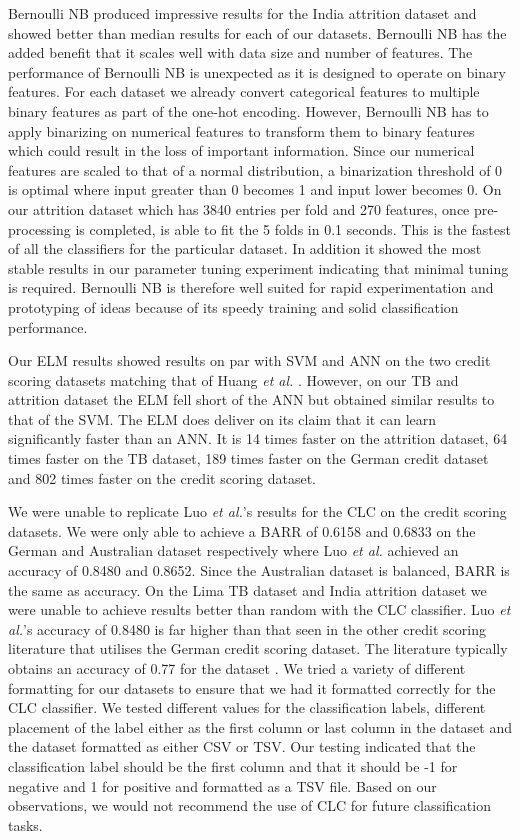 \documentclass{sig-alternate-05-2015}
\begin{document}
	Bernoulli NB produced impressive results for the India attrition dataset and showed better than median results for each of our datasets. Bernoulli NB has the added benefit that it scales well with data size and number of features. The performance of Bernoulli NB is unexpected as it is designed to operate on binary features. For each dataset we already convert categorical features to multiple binary features as part of the one-hot encoding. However, Bernoulli NB has to apply binarizing on numerical features to transform them to binary features which could result in the loss of important information. Since our numerical features are scaled to that of a normal distribution, a binarization threshold of 0 is optimal where input greater than 0 becomes 1 and input lower becomes 0. On our attrition dataset which has 3840 entries per fold and 270 features, once pre-processing is completed, is able to fit the 5 folds in 0.1 seconds. This is the fastest of all the classifiers for the particular dataset. In addition it showed the most stable results in our parameter tuning experiment indicating that minimal tuning is required. Bernoulli NB is therefore well suited for rapid experimentation and prototyping of ideas because of its speedy training and solid classification performance.

	Our ELM results showed results on par with SVM and ANN on the two credit scoring datasets matching that of Huang \textit{et al.} \cite{6035797, Huang2006489}. However, on our TB and attrition dataset the ELM fell short of the ANN but obtained similar results to that of the SVM. The ELM does deliver on its claim that it can learn significantly faster than an ANN. It is 14 times faster on the attrition dataset, 64 times faster on the TB dataset, 189 times faster on the German credit dataset and 802 times faster on the credit scoring dataset.
	
	We were unable to replicate Luo \textit{et al.}'s \cite{Luo20097562} results for the CLC on the credit scoring datasets. We were only able to achieve a BARR of 0.6158 and 0.6833 on the German and Australian dataset respectively where Luo \textit{et al.} achieved an accuracy of 0.8480 and 0.8652. Since the Australian dataset is balanced, BARR is the same as accuracy. On the Lima TB dataset and India attrition dataset we were unable to achieve results better than random with the CLC classifier. Luo \textit{et al.}'s accuracy of 0.8480 is far higher than that seen in the other credit scoring literature that utilises the German credit scoring dataset. The literature typically obtains an accuracy of 0.77 for the dataset \cite{Huang2007847, Nanni20093028, Tsai20082639, Wang2011223}. We tried a variety of different formatting for our datasets to ensure that we had it formatted correctly for the CLC classifier. We tested different values for the classification labels, different placement of the label either as the first column or last column in the dataset and the dataset formatted as either CSV or TSV. Our testing indicated that the classification label should be the first column and that it should be -1 for negative and 1 for positive and formatted as a TSV file. Based on our observations, we would not recommend the use of CLC for future classification tasks.	
	
\end{document}

